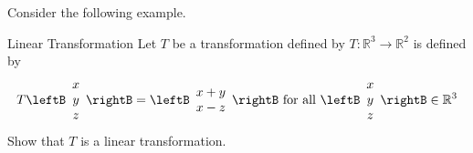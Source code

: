 Consider the following example.

\begin{example}{Linear Transformation}\label{exa:lineartransformation}
Let $T$ be a transformation defined by
$T:\mathbb{R}^3\to\mathbb{R}^2$ is defined by
\[
T\leftB\begin{array}{c} x \\ y \\ z \end{array}\rightB
= 
\leftB\begin{array}{c} x+y \\ x-z \end{array}\rightB
\mbox{ for all }
\leftB\begin{array}{c} x \\ y \\ z \end{array}\rightB \in\mathbb{R}^3
\]
Show that $T$ is a linear transformation.
\end{example}

